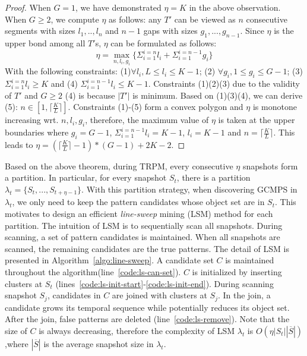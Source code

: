 {\begin{proof}
When $G = 1$, we have demonstrated $\eta=K$
in the above observation. When $G \geq 2$, we compute $\eta$ as follows:
any $T'$ can be viewed as $n$ consecutive segments with sizes $l_1,..,l_n$
and $n-1$ gaps with sizes $g_1,...,g_{n-1}$.
Since $\eta$ is the upper bond among all $T'$s, $\eta$ can be formulated 
as follows:
\begin{equation}
\eta = \max_{n,l_i,g_i} \{ \Sigma_{i=1}^{i=n} l_i + \Sigma_{i=1}^{i=n-1} g_i \}
\end{equation}
With the following constraints: (1)$\forall l_i, L \leq l_i \leq K-1$; (2)
$\forall g_i, 1 \leq g_i \leq G-1 $; (3) $\Sigma_{i=1}^{i=n} l_i \geq K$ and
(4) $\Sigma_{i=1}^{i=n-1}l_i  \leq K-1$. Constraints (1)(2)(3) due to the 
validity of $T'$ and $G\geq 2$ (4) is because $|T'|$ is minimum.
Based on (1)(3)(4), we can derive (5):  $n \in [1, \lceil \frac{K}{L} \rceil]$.
Constraints (1)-(5) form a convex polygon and $\eta$ is monotone
increasing wrt. $n, l_i, g_i$, therefore, the maximum value of $\eta$ is taken at the upper boundaries
where $g_i = G-1$, 
$\Sigma_{i=1}^{i=n-1}l_i = K-1$, $l_i = K-1$
and $n = \lceil \frac{K}{L} \rceil$. This leads to  $\eta = (\lceil \frac{K}{L} \rceil -1)*(G-1)+2K -2$.
\end{proof}
}

Based on the above theorem, during TRPM, every consecutive $\eta$ snapshots
form a partition. In particular, for every snapshot $S_t$, there is
a partition $\lambda_t=\{S_t,...,S_{t+\eta-1}\}$. With this partition strategy,
when discovering GCMPS in $\lambda_t$, we only need to keep the pattern candidates whose
object set are in $S_t$. This motivates to design an efficient 
\emph{line-sweep} mining (LSM) method for each partition. The intuition of LSM is 
to sequentially scan all snapshots. During scanning, a set of pattern candidates is maintained.
When all snapshots are scanned, the remaining candidates are the true patterns.
The detail of LSM is presented in Algorithm~\ref{algo:line-sweep}.
A candidate set $C$ is maintained throughout the algorithm(line~\ref{code:ls-can-set}). $C$
is initialized by inserting clusters at $S_t$ (lines~\ref{code:ls-init-start}-\ref{code:ls-init-end}).
During scanning snapshot $S_j$, candidates in $C$ are joined with clusters at $S_j$. In
the join, a candidate grows its temporal sequence while potentially reduces its object set. After the join,
false patterns are deleted (line~\ref{code:ls-remove}). 
Note that the size of $C$ is always decreasing, therefore the complexity of LSM $\lambda_t$ is $O(\eta|S_t||\overline{S}|)$,where $|\overline{S}|$ is the average snapshot size in $\lambda_t$.



